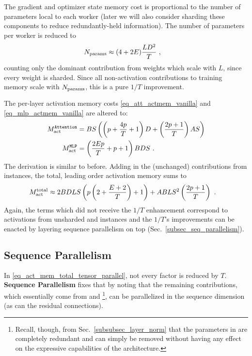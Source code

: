 \documentclass[11pt]{article}
\begin{document}
 The gradient and optimizer state memory cost is proportional to the number of parameters local to
 each worker (later we will also consider sharding these components to reduce redundantly-held
 information). The number of parameters per worker is reduced to
\begin{align}
    N _{ \rm params } &\approx  (4 + 2E) \frac{ L D ^{ 2 } }{ T }\ ,
    \label{eq_approx_params_tensor_parallel}
\end{align}
counting only the dominant contribution from weights which scale with $ L $, since every weight is
sharded. Since all non-activation contributions to training memory scale with $ N _{ {\rm params}  }
$, this is a pure $ 1/T $ improvement.

 The per-layer activation memory costs \eqref{eq_att_actmem_vanilla} and
 \eqref{eq_mlp_actmem_vanilla} are altered to:
\begin{align}
M _{ \rm act  } ^\texttt{Attention} &= BS \left ( \left (p + \frac{ 4p }{ T }+1 \right )D + \left
(\frac{ 2p+1 }{ T } \right )AS  \right ) \nonumber\\
M _{ \rm act  } ^\texttt{MLP} &= \left (\frac{ 2Ep }{ T }+p+1 \right )BDS\ .
\label{eq_act_mem_attn_mlp}
\end{align}
The derivation is similar to before. Adding in the (unchanged) contributions from
 instances, the total, leading order activation memory sums to
\begin{align}
    M _{ {\rm act}  } ^{ {\rm  total}  } & \approx  2BDLS   \left ( p \left (2+ \frac{ E+2 }{ T }\right ) + 1   \right )
    + ABLS ^{ 2 } \left ( \frac{ 2p+1 }{ T }\right ) \label{eq_act_mem_total_tensor_parallel}\ .
\end{align}
Again, the terms which did not receive the $ 1/T $ enhancement correspond to activations from
unsharded  and  instances and the $ 1/T $'s improvements can
be enacted by layering sequence parallelism on top (Sec.~\ref{subsec_seq_parallelism}).


\subsection{Sequence Parallelism \label{subsec_seq_parallelism}}

In \eqref{eq_act_mem_total_tensor_parallel}, not every factor is reduced by $ T $. \textbf{Sequence
Parallelism} fixes that by noting that the remaining contributions, which essentially come from
 and \footnote{Recall, though, from
Sec.~\ref{subsubsec_layer_norm} that the parameters in  are completely redundant
and can simply be removed without having any effect on the expressive capabilities of the
architecture.}, can be parallelized in the sequence dimension (as can the residual connections).
\end{document}

